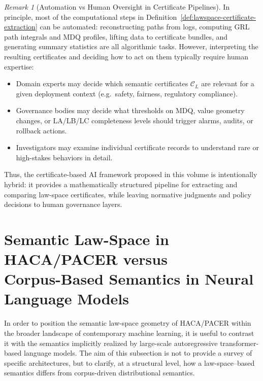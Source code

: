\documentclass[11pt]{book}
\theoremstyle{plain}
\theoremstyle{definition}
\theoremstyle{remark}
\newtheorem{remark}[theorem]{Remark}
\begin{document}
\begin{remark}[Automation vs Human Oversight in Certificate Pipelines]
\label{rem:automation-vs-human-oversight}
In principle, most of the computational steps in
Definition~\ref{def:lawspace-certificate-extraction} can be automated:
reconstructing paths from logs, computing GRL path integrals and MDQ
profiles, lifting data to certificate bundles, and generating summary
statistics are all algorithmic tasks. However, interpreting the
resulting certificates and deciding how to act on them typically
require human expertise:
\begin{itemize}
  \item Domain experts may decide which semantic certificates
        $\mathcal{C}_L$ are relevant for a given deployment context
        (e.g.\ safety, fairness, regulatory compliance).
  \item Governance bodies may decide what thresholds on MDQ, value
        geometry changes, or LA/LB/LC completeness levels should
        trigger alarms, audits, or rollback actions.
  \item Investigators may examine individual certificate records to
        understand rare or high-stakes behaviors in detail.
\end{itemize}
Thus, the certificate-based AI framework proposed in this volume is
intentionally hybrid: it provides a mathematically structured pipeline
for extracting and comparing law-space certificates, while leaving
normative judgments and policy decisions to human governance layers.
\end{remark}



\section[Semantic Law-Space vs Corpus Semantics in Neural LMs]{Semantic Law-Space in HACA/PACER versus \\Corpus-Based Semantics in Neural Language Models}
\label{subsec:haca-vs-neural-lm}

In order to position the semantic law-space geometry of HACA/PACER within
the broader landscape of contemporary machine learning, it is useful to
contrast it with the semantics implicitly realized by large-scale
autoregressive transformer-based language models. The aim of this
subsection is not to provide a survey of specific architectures, but to
clarify, at a structural level, how a law-space–based semantics differs
from corpus-driven distributional semantics.
\end{document}
